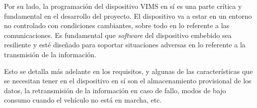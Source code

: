 Por su lado, la programación del dispositivo \ac{VIMS} en sí es una parte crítica y
fundamental en el desarrollo del proyecto. El dispositivo va a estar en un entorno
no controlado con condiciones cambiantes, sobre todo en lo referente a las comunicaciones.
Es fundamental que \textit{software} del dispositivo embebido
sea resiliente y esté diseñado para soportar situaciones adversas en lo referente
a la transmisión de la información.

Esto se detalla más adelante en los requisitos, y algunas de las características que
se necesitan tener en el dispositivo en sí son el almacenamiento provisional de los
datos, la retransmisión de la información en caso de fallo, modos de bajo consumo
cuando el vehículo no está en marcha, etc.

